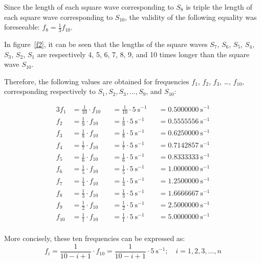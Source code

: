 \documentclass[11pt]{rMTA2010} \usepackage[utf8]{inputenc} \usepackage{graphicx} \usepackage{booktabs} \usepackage{array} \usepackage{enumerate}
\begin{document}
Since the length of each square wave corresponding to $S_{8}$ is triple the length of each square wave corresponding to $S_{10}$, the validity of the following equality was foreseeable: $f_8=\tfrac{1}{3}f_{10}$.

In figure~\ref{f2}, it can be seen that the lengths of the square waves $S_7$, $S_6$, $S_5$, $S_4$, $S_3$, $S_2$, $S_1$ are respectively 4, 5, 6, 7, 8, 9, and 10 times longer than the square wave $S_{10}$.

Therefore, the following values are obtained for frequencies $f_1$, $f_2$, $f_3$, \ldots, $f_{10}$, corresponding respectively to $S_1, S_2, S_3, \dots, S_9$, and $S_{10}$:

\begin{alignat*}{3}
f_1 &= \frac{1}{10}\cdot f_{10} & &= \frac{1}{10}\cdot 5 \:\mathrm{s}^{-1} & &= 0.5000000\:\mathrm{s}^{-1} \\
f_2 &= \frac{1}{9}\cdot f_{10} & &= \frac{1}{9}\cdot 5 \:\mathrm{s}^{-1} & &=  0.5555556\:\mathrm{s}^{-1} \\
f_3 &= \frac{1}{8}\cdot f_{10} & &= \frac{1}{8}\cdot 5 \:\mathrm{s}^{-1} & &=  0.6250000\:\mathrm{s}^{-1} \\
f_4 &= \frac{1}{7}\cdot f_{10} & &= \frac{1}{7}\cdot 5 \:\mathrm{s}^{-1} & &=  0.7142857\:\mathrm{s}^{-1} \\
f_5 &= \frac{1}{6}\cdot f_{10} & &= \frac{1}{6}\cdot 5 \:\mathrm{s}^{-1} & &=  0.8333333\:\mathrm{s}^{-1} \\
f_6 &= \frac{1}{5}\cdot f_{10} & &= \frac{1}{5}\cdot 5 \:\mathrm{s}^{-1} & &=  1.0000000\:\mathrm{s}^{-1} \\
f_7 &= \frac{1}{4}\cdot f_{10} & &= \frac{1}{4}\cdot 5 \:\mathrm{s}^{-1} & &=  1.2500000\:\mathrm{s}^{-1} \\
f_8 &= \frac{1}{3}\cdot f_{10} & &= \frac{1}{3}\cdot 5 \:\mathrm{s}^{-1} & &=  1.6666667\:\mathrm{s}^{-1} \\
f_9 &= \frac{1}{2}\cdot f_{10} & &= \frac{1}{2}\cdot 5 \:\mathrm{s}^{-1} & &=  2.5000000\:\mathrm{s}^{-1} \\
f_{10} &= \frac{1}{1}\cdot f_{10} & &= \frac{1}{1}\cdot 5 \:\mathrm{s}^{-1} & &=  5.0000000\:\mathrm{s}^{-1} \\
\end{alignat*}

More concisely, these ten frequencies can be expressed as:
\begin{equation*}
f_i = \frac{1}{10-i+1}\cdot f_{10} = \frac{1}{10-i+1}\cdot 5\:\mathrm{s}^{-1};\quad i = 1, 2, 3, \dots, n
\end{equation*}
\end{document}
